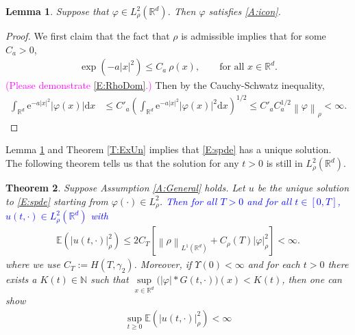 \documentclass[a4paper,11pt]{article}
\numberwithin{equation}{section}
\theoremstyle{plain}
\newtheorem{theorem}{Theorem}[section]
\newtheorem{lemma}[theorem]{Lemma}
\theoremstyle{definition}
\newcommand{\R}{\mathbb{R}}
\newcommand{\E}{\mathbb{E}}
\newcommand{\e}{\mathrm{e}}
\newcommand{\Norm}[1]{\left\|  #1   \right\|}
\newcommand{\ud}{\ensuremath{\mathrm{d}}}
\begin{document}
\begin{lemma}
	\label{L:phi}
	Suppose that $\varphi \in L^2_\rho(\R^d)$. Then $\varphi$ satisfies \eqref{A:icon}.
\end{lemma}

\begin{proof} 
	We first claim that the fact that $\rho$ is admissible implies that for some $C_a>0$,
	\begin{align}
		\label{E:RhoDom}
		\exp\left(-a|x|^2\right)\le C_a\: \rho(x),\qquad \text{for all $x\in\R^d$.}
	\end{align}
	\textcolor{magenta}{(Please demonstrate \eqref{E:RhoDom}.)} 
	Then by the Cauchy-Schwatz inequality, 
	\begin{align*}
		\int_{\R^d} \e^{-a|x|^2} |\varphi(x)|\ud x
		&\le C'_a \left(\int_{\R^d} \e^{-a|x|^2} |\varphi(x)|^2\ud x\right)^{1/2}
		\le C'_a C_a^{1/2} \Norm{\varphi}_\rho<\infty.
	\end{align*}
\end{proof}

Lemma \ref{L:phi} and Theorem \ref{T:ExUn} implies that \eqref{E:spde} has a unique solution. 
The following theorem tells us that the solution for any $t>0$ is still in $L_\rho^2(\R^d)$.

\begin{theorem} 
	\label{T:Moment}
	Suppose Assumption \ref{A:General} holds. 
	Let $u$ be the unique solution to \eqref{E:spde} starting from  $\varphi(\cdot) \in L^2_\rho$.
	\textcolor{blue}{Then for all $T>0$ and for all $t \in [0,T]$, $u(t,\cdot)\in L^2_\rho(\R^d)$ with} 
	\begin{align}
		\label{E:uNormRho}
		\E\left(| u(t,\cdot)|_\rho^2\right) 
		\le  2 C_T \left[ \Norm{\rho}_{L^1(\R^d)} + C_\rho(T) |\varphi|_{\rho}^2 \right]<\infty.
	\end{align}
	where we use $C_T:= H(T,\gamma_2)$. Moreover, if $\Upsilon(0)<\infty$ and 
	 for each $t>0$ there exists a $K(t) \in \mathbb N$ such that $\sup\limits_{x\in \R^d}\big(|\varphi|*G(t,\cdot)\big)(x) < K(t)$, then one can show
	\begin{align*}
		\sup_{t\ge 0}\E\left(|u(t,\cdot)|_\rho^2\right) < \infty  
	\end{align*}
\end{theorem}
\end{document}
